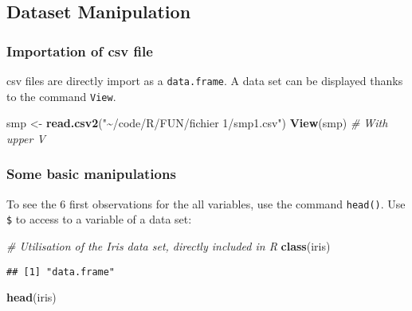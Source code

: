 \documentclass[
]{article}
\newenvironment{Shaded}{\begin{snugshade}}{\end{snugshade}}
\newcommand{\CommentTok}[1]{\textcolor[rgb]{0.56,0.35,0.01}{\textit{#1}}}
\newcommand{\FunctionTok}[1]{\textcolor[rgb]{0.13,0.29,0.53}{\textbf{#1}}}
\newcommand{\NormalTok}[1]{#1}
\newcommand{\OtherTok}[1]{\textcolor[rgb]{0.56,0.35,0.01}{#1}}
\newcommand{\StringTok}[1]{\textcolor[rgb]{0.31,0.60,0.02}{#1}}
\begin{document}
\hypertarget{dataset-manipulation}{%
\subsection{Dataset Manipulation}\label{dataset-manipulation}}

\hypertarget{importation-of-csv-file}{%
\subsubsection{Importation of csv file}\label{importation-of-csv-file}}

csv files are directly import as a \texttt{data.frame}. A data set can
be displayed thanks to the command \texttt{View}.

\begin{Shaded}
\begin{Highlighting}[]
\NormalTok{smp }\OtherTok{\textless{}{-}} \FunctionTok{read.csv2}\NormalTok{(}\StringTok{"\textasciitilde{}/code/R/FUN/fichier 1/smp1.csv"}\NormalTok{)}
\FunctionTok{View}\NormalTok{(smp) }\CommentTok{\# With upper V }
\end{Highlighting}
\end{Shaded}

\hypertarget{some-basic-manipulations}{%
\subsubsection{Some basic
manipulations}\label{some-basic-manipulations}}

To see the 6 first observations for the all variables, use the command
\texttt{head()}. Use \texttt{\$} to access to a variable of a data set:

\begin{Shaded}
\begin{Highlighting}[]
\CommentTok{\# Utilisation of the Iris data set, directly included in R}
\FunctionTok{class}\NormalTok{(iris)}
\end{Highlighting}
\end{Shaded}

\begin{verbatim}
## [1] "data.frame"
\end{verbatim}

\begin{Shaded}
\begin{Highlighting}[]
\FunctionTok{head}\NormalTok{(iris)}
\end{Highlighting}
\end{Shaded}
\end{document}
